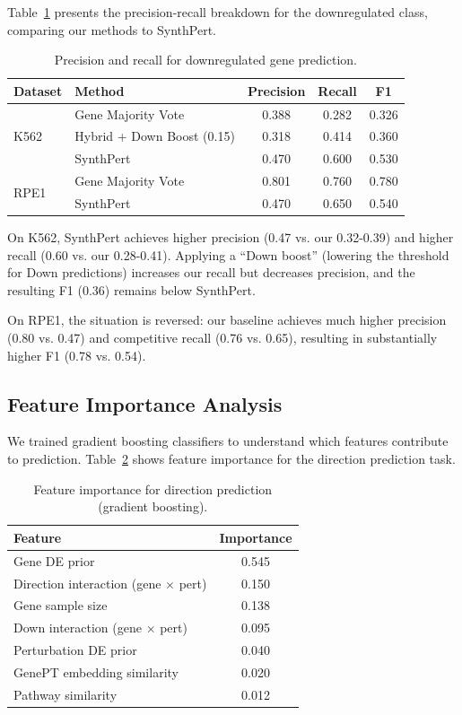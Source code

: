 \documentclass[11pt]{article}
\begin{document}
Table~\ref{tab:precision_recall} presents the precision-recall breakdown for the downregulated class, comparing our methods to SynthPert.

\begin{table}[h]
\centering
\caption{Precision and recall for downregulated gene prediction.}
\label{tab:precision_recall}
\begin{tabular}{llccc}
\toprule
Dataset & Method & Precision & Recall & F1 \\
\midrule
\multirow{3}{*}{K562}
& Gene Majority Vote & 0.388 & 0.282 & 0.326 \\
& Hybrid + Down Boost (0.15) & 0.318 & 0.414 & 0.360 \\
& SynthPert & 0.470 & 0.600 & 0.530 \\
\midrule
\multirow{2}{*}{RPE1}
& Gene Majority Vote & 0.801 & 0.760 & 0.780 \\
& SynthPert & 0.470 & 0.650 & 0.540 \\
\bottomrule
\end{tabular}
\end{table}

On K562, SynthPert achieves higher precision (0.47 vs. our 0.32-0.39) and higher recall (0.60 vs. our 0.28-0.41). Applying a ``Down boost'' (lowering the threshold for Down predictions) increases our recall but decreases precision, and the resulting F1 (0.36) remains below SynthPert.

On RPE1, the situation is reversed: our baseline achieves much higher precision (0.80 vs. 0.47) and competitive recall (0.76 vs. 0.65), resulting in substantially higher F1 (0.78 vs. 0.54).

\subsection{Feature Importance Analysis}

We trained gradient boosting classifiers to understand which features contribute to prediction. Table~\ref{tab:feature_importance} shows feature importance for the direction prediction task.

\begin{table}[h]
\centering
\caption{Feature importance for direction prediction (gradient boosting).}
\label{tab:feature_importance}
\begin{tabular}{lc}
\toprule
Feature & Importance \\
\midrule
Gene DE prior & 0.545 \\
Direction interaction (gene $\times$ pert) & 0.150 \\
Gene sample size & 0.138 \\
Down interaction (gene $\times$ pert) & 0.095 \\
Perturbation DE prior & 0.040 \\
GenePT embedding similarity & 0.020 \\
Pathway similarity & 0.012 \\
\bottomrule
\end{tabular}
\end{table}
\end{document}
